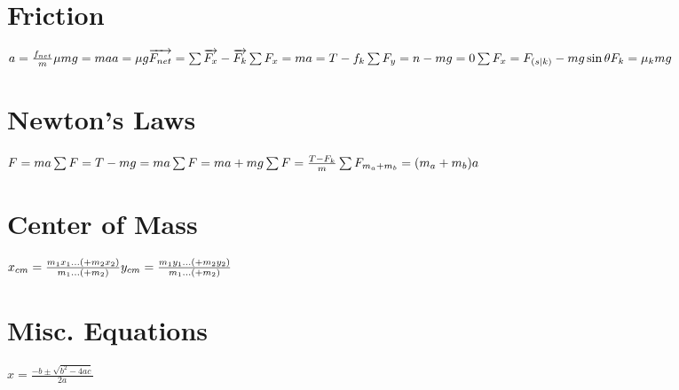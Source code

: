 \documentclass[11pt]{article}
\begin{document}
\begin{paracol}{3}
        \section*{Friction}
        \begin{fleqn}
            $
            a=\frac{f_{net}}{m} \newline
            \mu mg = ma \newline
            a= \mu g \newline
            \overrightarrow{F_{net}} = \sum \overrightarrow{F_x}-\overrightarrow{F_{k}} \newline
            \sum F_x = ma = T-f_k \newline
            \sum F_y = n-mg = 0 \newline
            \sum F_x = F_{(s|k)} - mg\sin\theta \newline
            F_k = \mu_{k}mg \newline
            $
        \end{fleqn}
        \section*{Newton's Laws}
        \begin{fleqn}
            $
            F=ma \newline
            \sum F = T - mg = ma \newline
            \sum F = ma + mg \newline
            \sum F = \frac{T-F_k}{m} \newline
            \sum F_{m_a+m_b} = (m_a+m_b)a \newline
            $
        \end{fleqn}
        \section*{Center of Mass}
        \begin{fleqn}
            $
            x_{cm} = \frac{m_1x_1...(+m_2x_2)}{m_1...(+m_2)} \newline
            y_{cm} = \frac{m_1y_1...(+m_2y_2)}{m_1...(+m_2)}
            $
        \end{fleqn}
        \section*{Misc. Equations}
        \begin{fleqn}
            $
            x = \frac{-b \pm \sqrt{b^2-4ac}}{2a}
            $
        \end{fleqn}
    \end{paracol}
\end{document}
